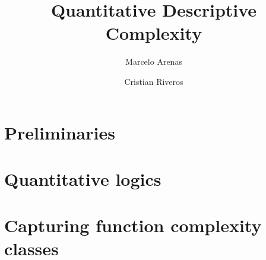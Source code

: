 \documentclass[a4paper]{article}
\begin{document}
\title{Quantitative Descriptive Complexity}
\author{Marcelo Arenas \and Cristian Riveros}

\maketitle

\section{Preliminaries}
\label{sec:prelim}



\section{Quantitative logics}
\label{sec:logics}



\section{Capturing function complexity classes}
\label{sec:cap-comp}





\end{document}
